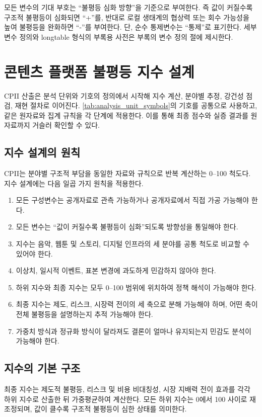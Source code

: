 \documentclass[11pt,a4paper]{report}
\begin{document}
모든 변수의 기대 부호는 ``불평등 심화 방향''을 기준으로 부여한다. 즉 값이 커질수록 구조적 불평등이 심화되면 ``+''를, 반대로 로컬 생태계의 협상력 또는 회수 가능성을 높여 불평등을 완화하면 ``-''를 부여한다. 단, 순수 통제변수는 ``통제''로 표기한다. 세부 변수 정의와 longtable 형식의 부록용 사전은 부록의 변수 정의 절에 제시한다.

\chapter{콘텐츠 플랫폼 불평등 지수 설계}
CPII 산출은 분석 단위와 기호의 정의에서 시작해 지수 계산, 분야별 추정, 강건성 점검, 재현 절차로 이어진다. \autoref{tab:analysis_unit_symbols}의 기호를 공통으로 사용하고, 같은 원자료와 집계 규칙을 각 단계에 적용한다. 이를 통해 최종 점수와 실증 결과를 원자료까지 거슬러 확인할 수 있다.

\section{지수 설계의 원칙}
CPII는 분야별 구조적 부담을 동일한 자료와 규칙으로 반복 계산하는 0--100 척도다. 지수 설계에는 다음 일곱 가지 원칙을 적용한다.
\begin{enumerate}[label=\arabic*.]
  \item 모든 구성변수는 공개자료로 관측 가능하거나 공개자료에서 직접 가공 가능해야 한다.
  \item 모든 변수는 ``값이 커질수록 불평등이 심화''되도록 방향성을 통일해야 한다.
  \item 지수는 음악, 웹툰 및 스토리, 디지털 인프라의 세 분야를 공통 척도로 비교할 수 있어야 한다.
  \item 이상치, 일시적 이벤트, 표본 변경에 과도하게 민감하지 않아야 한다.
  \item 하위 지수와 최종 지수는 모두 0--100 범위에 위치하여 정책 해석이 가능해야 한다.
  \item 최종 지수는 제도, 리스크, 시장력 전이의 세 축으로 분해 가능해야 하며, 어떤 축이 전체 불평등을 설명하는지 추적 가능해야 한다.
  \item 가중치 방식과 정규화 방식이 달라져도 결론이 얼마나 유지되는지 민감도 분석이 가능해야 한다.
\end{enumerate}

\section{지수의 기본 구조}
최종 지수는 제도적 불평등, 리스크 및 비용 비대칭성, 시장 지배력 전이 효과를 각각 하위 지수로 산출한 뒤 가중평균하여 계산한다. 모든 하위 지수는 0에서 100 사이로 재조정되며, 값이 클수록 구조적 불평등이 심한 상태를 의미한다.
\end{document}
